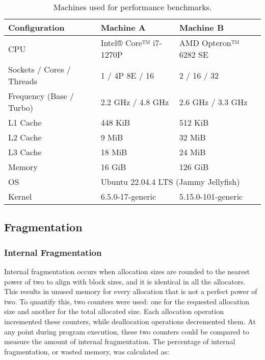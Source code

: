 \begin{table}[h]
    \begin{tabular}{lll}
        \textbf{Configuration}    & \textbf{Machine A}                                       & \textbf{Machine B}   \\ \hline
        CPU                       & Intel® Core™ i7-1270P                                    & AMD Opteron™ 6282 SE \\ \hline
        Sockets / Cores / Threads & 1 / 4P 8E / 16                                           & 2 / 16 / 32          \\ \hline
        Frequency (Base / Turbo)  & 2.2 GHz / 4.8 GHz                                        & 2.6 GHz / 3.3 GHz    \\ \hline
        L1 Cache                  & 448 KiB                                                  & 512 KiB              \\ \hline
        L2 Cache                  & 9 MiB                                                    & 32 MiB               \\ \hline
        L3 Cache                  & 18 MiB                                                   & 24 MiB               \\ \hline
        Memory                    & 16 GiB                                                   & 126 GiB              \\ \hline
        OS                        & \multicolumn{2}{l}{Ubuntu 22.04.4 LTS (Jammy Jellyfish)}                        \\ \hline
        Kernel                    & 6.5.0-17-generic                                         & 5.15.0-101-generic   \\
    \end{tabular}
    \centering
    \caption{Machines used for performance benchmarks.}
    \label{table:performancespecs}
\end{table}

\newpage
\subsection{Fragmentation} \label{sec:frageval}
\subsubsection{Internal Fragmentation}
Internal fragmentation occurs when allocation sizes are rounded to the nearest power of two to align with block sizes, and it is identical in all the allocators. This results in unused memory for every allocation that is not a perfect power of two. To quantify this, two counters were used: one for the requested allocation size and another for the total allocated size. Each allocation operation incremented these counters, while deallocation operations decremented them. At any point during program execution, these two counters could be compared to measure the amount of internal fragmentation. The percentage of internal fragmentation, or wasted memory, was calculated as:


